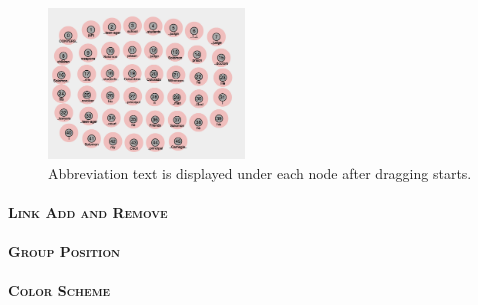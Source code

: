 \begin{figure}
\begin{center}
\includegraphics[height=4cm]{figs/abbrText.jpg}
\caption{Abbreviation text is displayed under each node after dragging starts.}
\label{fig:abbrtext}
\end{center}
\end{figure}

\paragraph{\textsc{Link Add and Remove}\\}

\paragraph{\textsc{Group Position}\\}

\paragraph{\textsc{Color Scheme}\\}